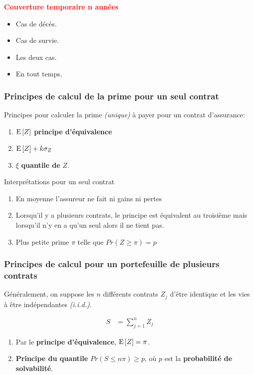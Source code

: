 \documentclass[10pt, french]{article}
\begin{document}
\begin{multicols*}{3}
\textbf{\textcolor{red}{Couverture temporaire n années}}
\begin{itemize}
	\item[$\Ax{\termxn}$] Cas de décès.
	\item[$\Ax{\pureendowxn}$] Cas de survie.
	\item[$\Ax{x:\angln}$] Les deux cas.
	\item[$\Ax{x}$] En tout temps.
\end{itemize}

\subsubsection*{Principes de calcul de la prime pour un seul contrat}


Principes pour calculer la prime \textit{(unique)} à payer pour un contrat d'assurance:
\begin{enumerate}
	\item $\mathrm{E} \left[ Z \right]$ \textbf{principe d'équivalence}
	\item $\mathrm{E} \left[ Z \right] + k \sigma_Z$
	\item $\xi$ \textbf{quantile de} $Z$.\\
\end{enumerate}

Interprétations pour un seul contrat
\begin{enumerate}
	\item En moyenne l'assureur ne fait ni gains ni pertes
	\item Lorsqu'il y a plusieurs contrats, le principe est équivalent au troisième mais lorsqu'il n'y en a qu'un seul alors il ne tient pas.
	\item Plus petite prime $\pi$ telle que $Pr(Z \ge \pi) = p$
\end{enumerate}

\subsubsection*{Principes de calcul pour un portefeuille de plusieurs contrats}

Généralement, on suppose les $n$ différents contrats $Z_{j}$ d'être identique et les vies à être indépendantes \textit{(i.i.d.)}.

\begin{align*}	
	S &= \sum_{j = 1}^{n} Z_j 
\end{align*}

\begin{enumerate}
	\item[1. ] Par le \textbf{principe d'équivalence}, $\mathrm{E} \left[ Z \right] = \pi$.
	\item[3. ] \textbf{Principe du quantile }$Pr(S \le n \pi) \ge p$, où $p$ est la \textbf{probabilité de solvabilité}.
\end{enumerate}


\end{multicols*}
\end{document}

